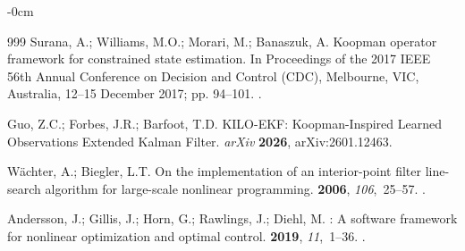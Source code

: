 \documentclass[asi,article,accept,pdftex,moreauthors]{Definitions/mdpi}
\begin{document}
\begin{adjustwidth}{-\extralength}{0cm}
\begin{thebibliography}{999}
Surana, A.; Williams, M.O.; Morari, M.; Banaszuk, A.
\newblock Koopman operator framework for constrained state estimation.
\newblock In Proceedings of the 2017 IEEE 56th Annual Conference on Decision
  and Control (CDC),  Melbourne, VIC, Australia, 12--15 December 2017; pp. 94--101.
.

Guo, Z.C.; Forbes, J.R.; Barfoot, T.D.
\newblock KILO-EKF: Koopman-Inspired Learned Observations Extended Kalman
  Filter.  \emph{arXiv} \textbf{2026}, arXiv:2601.12463.

W\"{a}chter, A.; Biegler, L.T.
\newblock On the implementation of an interior-point filter line-search algorithm for large-scale nonlinear programming.
 {\bf 2006}, {\em 106},~25--57.
.

Andersson, J.; Gillis, J.; Horn, G.; Rawlings, J.; Diehl, M.
: A software framework for nonlinear optimization and optimal
  control.
 {\bf 2019}, {\em 11},~1--36.
.

\end{thebibliography}
\PublishersNote{}
%
\end{adjustwidth}
\end{document}
